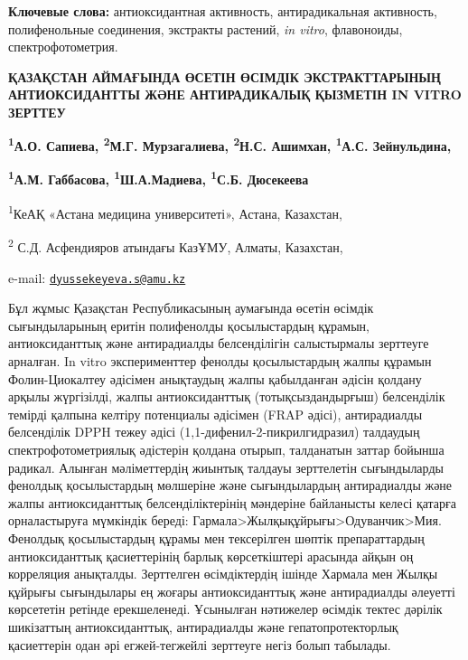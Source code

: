 {\bfseries Ключевые слова:} антиоксидантная активность, антирадикальная
активность, полифенольные соединения, экстракты растений, \emph{in
vitro}, флавоноиды, спектрофотометрия.

\begin{articleheader}
{\bfseries ҚАЗАҚСТАН АЙМАҒЫНДА ӨСЕТІН ӨСІМДІК ЭКСТРАКТТАРЫНЫҢ
АНТИОКСИДАНТТЫ ЖӘНЕ АНТИРАДИКАЛЫҚ ҚЫЗМЕТІН IN VITRO ЗЕРТТЕУ}

{\bfseries \textsuperscript{1}А.О. Сапиева, \textsuperscript{2}М.Г.
Мурзагалиева, \textsuperscript{2}Н.С. Ашимхан, \textsuperscript{1}А.С.
Зейнульдина,}

{\bfseries \textsuperscript{1}А.М. Габбасова,
\textsuperscript{1}Ш.А.Мадиева, \textsuperscript{1}С.Б.
Дюсекеева}\textsuperscript{\envelope }
\end{articleheader}

\begin{affiliation}
\textsuperscript{1}КеАҚ «Астана медицина университеті», Астана,
Казахстан,

\textsuperscript{2} С.Д. Асфендияров атындағы КазҰМУ, Алматы, Казахстан,

e-mail: \href{mailto:dyussekeyeva.s@amu.kz}{\nolinkurl{dyussekeyeva.s@amu.kz}}
\end{affiliation}

Бұл жұмыс Қазақстан Республикасының аумағында өсетін өсімдік
сығындыларының еритін полифенолды қосылыстардың құрамын, антиоксиданттық
және антирадиалды белсенділігін салыстырмалы зерттеуге арналған. In
vitro эксперименттер фенолды қосылыстардың жалпы құрамын Фолин-Циокалтеу
әдісімен анықтаудың жалпы қабылданған әдісін қолдану арқылы жүргізілді,
жалпы антиоксиданттық (тотықсыздандырғыш) белсенділік темірді қалпына
келтіру потенциалы әдісімен (FRAP әдісі), антирадиалды белсенділік DPPH
тежеу әдісі (1,1-дифенил-2-пикрилгидразил) талдаудың
спектрофотометриялық әдістерін қолдана отырып, талданатын заттар бойынша
радикал. Алынған мәліметтердің жиынтық талдауы зерттелетін сығындыларды
фенолдық қосылыстардың мөлшеріне және сығындылардың антирадиалды және
жалпы антиоксиданттық белсенділіктерінің мәндеріне байланысты келесі
қатарға орналастыруға мүмкіндік береді:
Гармала\textgreater Жылқықұйрығы\textgreater Одуванчик\textgreater Мия.
Фенолдық қосылыстардың құрамы мен тексерілген шөптік препараттардың
антиоксиданттық қасиеттерінің барлық көрсеткіштері арасында айқын оң
корреляция анықталды. Зерттелген өсімдіктердің ішінде Хармала мен Жылқы
құйрығы сығындылары ең жоғары антиоксиданттық және антирадиалды әлеуетті
көрсететін ретінде ерекшеленеді. Ұсынылған нәтижелер өсімдік тектес
дәрілік шикізаттың антиоксиданттық, антирадиалды және гепатопротекторлық
қасиеттерін одан әрі егжей-тегжейлі зерттеуге негіз болып табылады.

